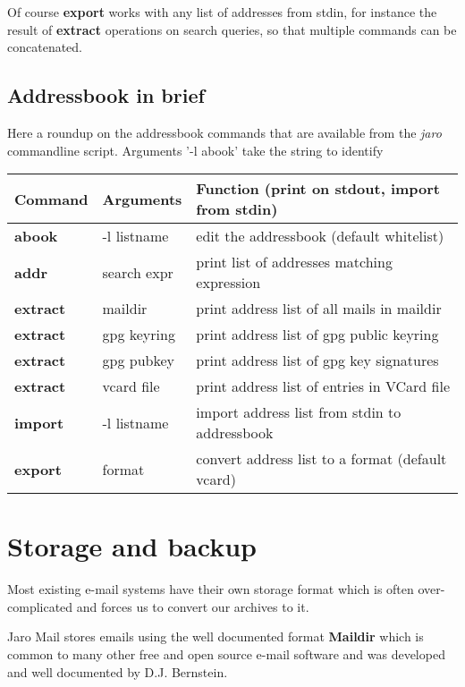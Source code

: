 \documentclass[a4,onecolumn,portrait]{article}
\begin{document}
Of course \textbf{export} works with any list of addresses from stdin, for instance the result of \textbf{extract} operations on search queries, so that multiple commands can be concatenated.

\subsection{Addressbook in brief}
\label{sec-9-3}

Here a roundup on the addressbook commands that are available from the \emph{jaro} commandline script. Arguments '-l abook' take the string to identify

\begin{center}
\begin{tabular}{lll}
Command & Arguments & Function (print on stdout, import from stdin)\\
\hline
\textbf{abook} & -l listname & edit the addressbook (default whitelist)\\
\textbf{addr} & search expr & print list of addresses matching expression\\
\textbf{extract} & maildir & print address list of all mails in maildir\\
\textbf{extract} & gpg keyring & print address list of gpg public keyring\\
\textbf{extract} & gpg pubkey & print address list of gpg key signatures\\
\textbf{extract} & vcard file & print address list of entries in VCard file\\
\textbf{import} & -l listname & import address list from stdin to addressbook\\
\textbf{export} & format & convert address list to a format (default vcard)\\
\end{tabular}
\end{center}

\section{Storage and backup}
\label{sec-10}

Most existing e-mail systems have their own storage format which is
often over-complicated and forces us to convert our archives to it.

Jaro Mail stores emails using the well documented format \textbf{Maildir}
which is common to many other free and open source e-mail software and
was developed and well documented by D.J. Bernstein.
\end{document}
